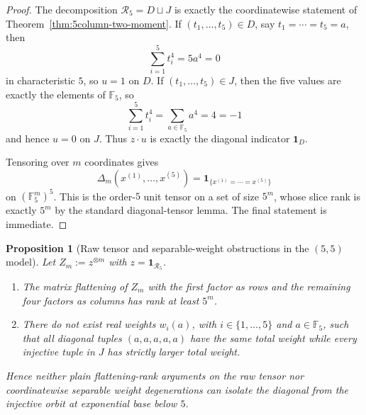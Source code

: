 \documentclass[11pt]{article}
\newtheorem{proposition}[theorem]{Proposition}
\theoremstyle{definition}
\newcommand{\1}{\mathbf{1}}
\begin{document}
\begin{proof}
The decomposition $\mathcal R_5=D\sqcup J$ is exactly the coordinatewise statement of Theorem~\ref{thm:5column-two-moment}. If $(t_1,\dots,t_5)\in D$, say $t_1=\cdots=t_5=a$, then
\[
\sum_{i=1}^5 t_i^4=5a^4=0
\]
in characteristic $5$, so $u=1$ on $D$. If $(t_1,\dots,t_5)\in J$, then the five values are exactly the elements of $\mathbb F_5$, so
\[
\sum_{i=1}^5 t_i^4=\sum_{a\in\mathbb F_5} a^4=4=-1
\]
and hence $u=0$ on $J$. Thus $z\cdot u$ is exactly the diagonal indicator $\mathbf 1_D$.

Tensoring over $m$ coordinates gives
\[
\Delta_m(x^{(1)},\dots,x^{(5)})=\mathbf 1_{\{x^{(1)}=\cdots=x^{(5)}\}}
\]
on $(\mathbb F_5^m)^5$. This is the order-$5$ unit tensor on a set of size $5^m$, whose slice rank is exactly $5^m$ by the standard diagonal-tensor lemma. The final statement is immediate.
\end{proof}

\begin{proposition}[Raw tensor and separable-weight obstructions in the $(5,5)$ model]\label{prop:555-raw-tensor-obstruction}
Let $Z_m:=z^{\otimes m}$ with $z=\mathbf 1_{\mathcal R_5}$.
\begin{enumerate}[label=(\roman*),leftmargin=2.2em]
\item The matrix flattening of $Z_m$ with the first factor as rows and the remaining four factors as columns has rank at least $5^m$.
\item There do not exist real weights $w_i(a)$, with $i\in\{1,\dots,5\}$ and $a\in\mathbb F_5$, such that all diagonal tuples $(a,a,a,a,a)$ have the same total weight while every injective tuple in $J$ has strictly larger total weight.
\end{enumerate}
Hence neither plain flattening-rank arguments on the raw tensor nor coordinatewise separable weight degenerations can isolate the diagonal from the injective orbit at exponential base below $5$.
\end{proposition}
\end{document}
